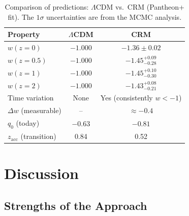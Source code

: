 \documentclass[aps,prd,twocolumn,superscriptaddress,nofootinbib]{revtex4-2}
\begin{document}
\begin{table}[htbp]
\centering
\caption{Comparison of predictions: $\Lambda$CDM vs.\ CRM (Pantheon+ fit). The $1\sigma$ uncertainties are from the MCMC analysis.}
\label{tab:predictions}
\begin{tabular}{lcc}
\toprule
\textbf{Property} & $\Lambda$CDM & CRM \\
\midrule
$w(z{=}0)$ & $-1.000$ & $-1.36 \pm 0.02$ \\
$w(z{=}0.5)$ & $-1.000$ & $-1.45^{+0.09}_{-0.28}$ \\
$w(z{=}1)$ & $-1.000$ & $-1.45^{+0.10}_{-0.30}$ \\
$w(z{=}2)$ & $-1.000$ & $-1.43^{+0.08}_{-0.21}$ \\
Time variation & None & Yes (consistently $w < -1$) \\
$\Delta w$ (measurable) & -- & $\approx -0.4$ \\
$q_0$ (today) & $-0.63$ & $-0.81$ \\
$z_{\mathrm{acc}}$ (transition) & 0.84 & 0.52 \\
\bottomrule
\end{tabular}
\end{table}


\section{Discussion}
\label{sec:discussion}

\subsection{Strengths of the Approach}
\end{document}
